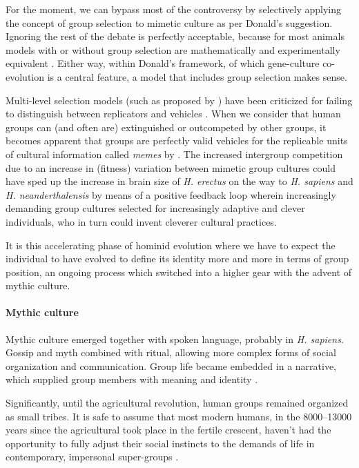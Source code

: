 \documentclass{article}
\begin{document}
For the moment, we can bypass most of the controversy by selectively applying the
concept of group selection to mimetic culture as per Donald's suggestion.
Ignoring the rest of the debate is perfectly acceptable, because for most
animals models with or without group selection are mathematically and
experimentally equivalent \citep{dennett2002}. Either way, within Donald's
framework, of which gene-culture co-evolution is a central feature, a model
that includes group selection makes sense.

Multi-level selection models (such as proposed by \citealp{sober1999}) have
been criticized for failing to distinguish between replicators and vehicles
\citep{dennett2002}.  When we consider that human groups can (and often are)
extinguished or outcompeted by other groups, it becomes apparent that groups are
perfectly valid vehicles for the replicable units of cultural information called
\emph{memes} by \citet{dawkins1976}. The increased intergroup competition due
to an increase in (fitness) variation between mimetic group cultures could have
sped up the increase in brain size of \textit{H. erectus} on the way to
\textit{H. sapiens} and \textit{H. neanderthalensis} by means of a positive
feedback loop wherein increasingly demanding group cultures selected for
increasingly adaptive and clever individuals, who in turn could invent cleverer
cultural practices.

It is this accelerating phase of hominid evolution where we have to expect the
individual to have evolved to define its identity more and more in terms of
group position, an ongoing process which switched into a higher gear with the
advent of mythic culture.

\paragraph{Mythic culture}

Mythic culture emerged together with spoken language, probably in \textit{H.
sapiens}. Gossip and myth combined with ritual, allowing more complex forms of
social organization and communication. Group life became embedded in a
narrative, which supplied group members with meaning and identity \citep{donald1991}. 

Significantly, until the agricultural revolution, human groups remained
organized as small tribes. It is safe to assume that most modern humans, in the
8000--13000 years since the agricultural took place in the fertile crescent,
haven't had the opportunity to fully adjust their social instincts to the
demands of life in contemporary, impersonal super-groups \citep{quinn1992}.
\end{document}
